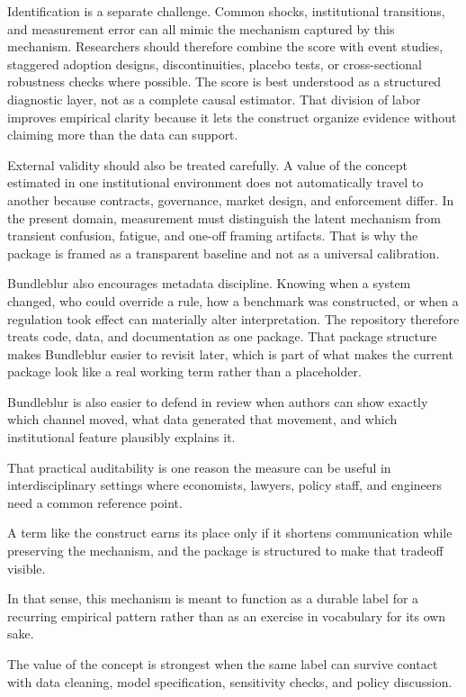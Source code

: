 \documentclass[12pt]{article}
\begin{document}
Identification is a separate challenge. Common shocks, institutional transitions, and measurement error can all mimic the mechanism captured by this mechanism. Researchers should therefore combine the score with event studies, staggered adoption designs, discontinuities, placebo tests, or cross-sectional robustness checks where possible. The score is best understood as a structured diagnostic layer, not as a complete causal estimator. That division of labor improves empirical clarity because it lets the construct organize evidence without claiming more than the data can support.

External validity should also be treated carefully. A value of the concept estimated in one institutional environment does not automatically travel to another because contracts, governance, market design, and enforcement differ. In the present domain, measurement must distinguish the latent mechanism from transient confusion, fatigue, and one-off framing artifacts. That is why the package is framed as a transparent baseline and not as a universal calibration.

Bundleblur also encourages metadata discipline. Knowing when a system changed, who could override a rule, how a benchmark was constructed, or when a regulation took effect can materially alter interpretation. The repository therefore treats code, data, and documentation as one package. That package structure makes Bundleblur easier to revisit later, which is part of what makes the current package look like a real working term rather than a placeholder.

Bundleblur is also easier to defend in review when authors can show exactly which channel moved, what data generated that movement, and which institutional feature plausibly explains it.

That practical auditability is one reason the measure can be useful in interdisciplinary settings where economists, lawyers, policy staff, and engineers need a common reference point.

A term like the construct earns its place only if it shortens communication while preserving the mechanism, and the package is structured to make that tradeoff visible.

In that sense, this mechanism is meant to function as a durable label for a recurring empirical pattern rather than as an exercise in vocabulary for its own sake.

The value of the concept is strongest when the same label can survive contact with data cleaning, model specification, sensitivity checks, and policy discussion.
\end{document}
